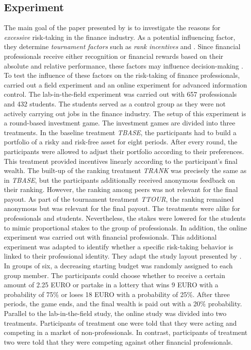 \documentclass[12pt]{article}
\begin{document}
\subsection{Experiment} \label{subsection:experiment}
The main goal of the paper presented by \textcite{Kirchler2018} is to investigate the reasons for \textit{excessive} risk-taking in the finance industry. As a potential influencing factor, they determine \textit{tournament factors} such as \textit{rank incentives} and . Since financial professionals receive either recognition or financial rewards based on their absolute and relative performance, these factors may influence decision-making \parencite{Charness2014}. To test the influence of these factors on the risk-taking of finance professionals, \textcite{Kirchler2018} carried out a field experiment and an online experiment for advanced information control. The lab-in-the-field experiment was carried out with 657 professionals and 432 students. The students served as a control group as they were not actively carrying out jobs in the finance industry. The setup of this experiment is a round-based investment game. The investment games are divided into three treatments. In the baseline treatment \textit{TBASE}, the participants had to build a portfolio of a risky and risk-free asset for eight periods. After every round, the participants were allowed to adjust their portfolio according to their preferences. This treatment provided incentives linearly according to the participant's final wealth. The built-up of the ranking treatment \textit{TRANK} was precisely the same as in \textit{TBASE}, but the participants additionally received anonymous feedback on their ranking. However, the ranking among peers was not relevant for the final payout. As part of the tournament treatment \textit{TTOUR}, the ranking remained anonymous but was relevant for the final payout. The treatments were alike for professionals and students. Nevertheless, the stakes were lowered for the students to mimic proportional stakes to the group of professionals. In addition, the online experiment was carried out with financial professionals. This additional experiment was adapted to identify whether a specific risk-taking behavior is linked to their professional identity. They adapt the study layout presented by \textcite{Kuziemko2011}. In groups of six, a decreasing starting budget was randomly assigned to each group member. The participants could choose whether to receive a certain amount of  2.25 EURO or partake in a lottery that wins 9 EURO with a probability of 75\% or loses 18 EURO with a probability of 25\%.  After three periods, the game ends, and the final wealth is paid out with a 20\% probability. Parallel to the lab-in-the-field study, the online study was divided into two treatments. Participants of treatment one were told that they were acting and competing in a market of non-professionals. In contrast, participants of treatment two were told that they were competing against other financial professionals. 
\end{document}

